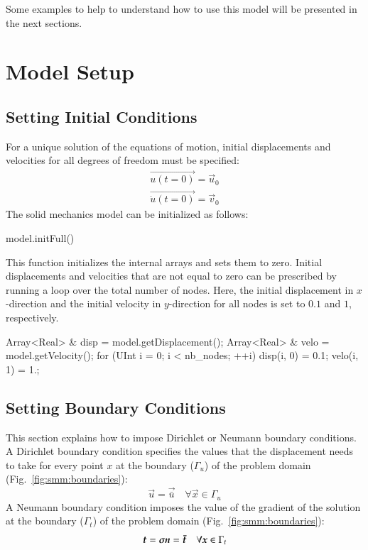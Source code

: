 Some examples to help to understand how to use this model will be
presented in the next sections.

\section{Model Setup}


\subsection{Setting Initial Conditions \label{sect:smm:initial_condition}}

For a unique solution of the equations of motion, initial
displacements and velocities for all degrees of freedom must be
specified:
\begin{eqnarray}
  \vec{u(t=0)} = \vec{u}_{0}\\
  \vec{\dot u(t=0)} =\vec{v}_{0}
\end{eqnarray} The solid mechanics model can be initialized as
follows:
\begin{cpp}
  model.initFull()
\end{cpp}
This function initializes the internal arrays and sets them to
zero. Initial displacements and velocities that are not equal to zero
can be prescribed by running a loop over the total number of
nodes. Here, the initial displacement in $x$-direction and the
initial velocity in $y$-direction for all nodes is set to $0.1$ and $1$,
respectively.
\begin{cpp}
Array<Real> & disp = model.getDisplacement();
Array<Real> & velo = model.getVelocity();
for (UInt i = 0; i < nb_nodes; ++i) {
  disp(i, 0) = 0.1;
  velo(i, 1) = 1.;
}
\end{cpp}

\subsection{Setting Boundary Conditions\label{sect:smm:boundary}}
This section explains how to impose Dirichlet or Neumann boundary
conditions. A Dirichlet boundary condition specifies the values that
the displacement needs to take for every point $x$ at the boundary
($\Gamma_u$) of the problem domain (Fig.~\ref{fig:smm:boundaries}):
\begin{equation}
  \vec{u} = \vec{\bar u} \quad \forall \vec{x}\in
  \Gamma_{u}
\end{equation}
A Neumann boundary condition imposes the value of the gradient of the
solution at the boundary ($\Gamma_t$) of the problem domain
(Fig.~\ref{fig:smm:boundaries}):
\begin{equation}
  \boldsymbol{t} = \boldsymbol{\sigma} \boldsymbol{n} = \boldsymbol{\bar t} \quad
  \forall \boldsymbol{x}\in \Gamma_{t}
\end{equation}

